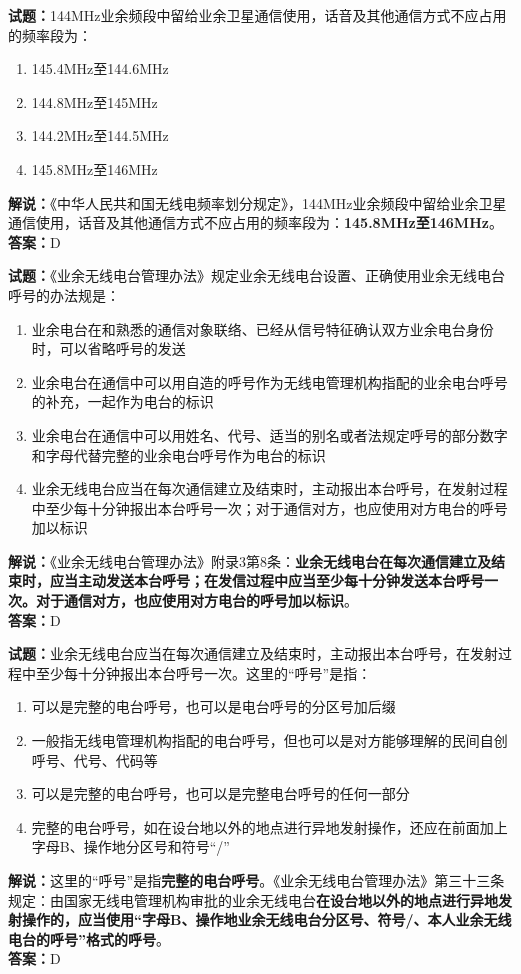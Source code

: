 \documentclass{ctexbook}
\begin{document}
\bigskip


\noindent\textbf{试题：}144MHz业余频段中留给业余卫星通信使用，话音及其他通信方式不应占用的频率段为：
\begin{enumerate}[leftmargin=3em]
	\item 145.4MHz至144.6MHz
	\item 144.8MHz至145MHz
	\item 144.2MHz至144.5MHz
	\item 145.8MHz至146MHz
\end{enumerate}
\noindent\textbf{解说：}《中华人民共和国无线电频率划分规定》，144MHz业余频段中留给业余卫星通信使用，话音及其他通信方式不应占用的频率段为：\textbf{145.8MHz至146MHz}。\\\noindent\textbf{答案：}D



\bigskip


\noindent\textbf{试题：}《业余无线电台管理办法》规定业余无线电台设置、正确使用业余无线电台呼号的办法规是：
\begin{enumerate}[leftmargin=3em]
	\item 业余电台在和熟悉的通信对象联络、已经从信号特征确认双方业余电台身份时，可以省略呼号的发送
	\item 业余电台在通信中可以用自造的呼号作为无线电管理机构指配的业余电台呼号的补充，一起作为电台的标识
	\item 业余电台在通信中可以用姓名、代号、适当的别名或者法规定呼号的部分数字和字母代替完整的业余电台呼号作为电台的标识
	\item 业余无线电台应当在每次通信建立及结束时，主动报出本台呼号，在发射过程中至少每十分钟报出本台呼号一次；对于通信对方，也应使用对方电台的呼号加以标识
\end{enumerate}
\noindent\textbf{解说：}《业余无线电台管理办法》附录3第8条：\textbf{业余无线电台在每次通信建立及结束时，应当主动发送本台呼号；在发信过程中应当至少每十分钟发送本台呼号一次。对于通信对方，也应使用对方电台的呼号加以标识}。\\\noindent\textbf{答案：}D



\bigskip


\noindent\textbf{试题：}业余无线电台应当在每次通信建立及结束时，主动报出本台呼号，在发射过程中至少每十分钟报出本台呼号一次。这里的“呼号”是指：
\begin{enumerate}[leftmargin=3em]
	\item 可以是完整的电台呼号，也可以是电台呼号的分区号加后缀
	\item 一般指无线电管理机构指配的电台呼号，但也可以是对方能够理解的民间自创呼号、代号、代码等
	\item 可以是完整的电台呼号，也可以是完整电台呼号的任何一部分
	\item 完整的电台呼号，如在设台地以外的地点进行异地发射操作，还应在前面加上字母B、操作地分区号和符号“/”
\end{enumerate}
\noindent\textbf{解说：}这里的“呼号”是指\textbf{完整的电台呼号}。《业余无线电台管理办法》第三十三条规定：由国家无线电管理机构审批的业余无线电台\textbf{在设台地以外的地点进行异地发射操作的，应当使用“字母B、操作地业余无线电台分区号、符号/、本人业余无线电台的呼号”格式的呼号}。\\\noindent\textbf{答案：}D
\end{document}
